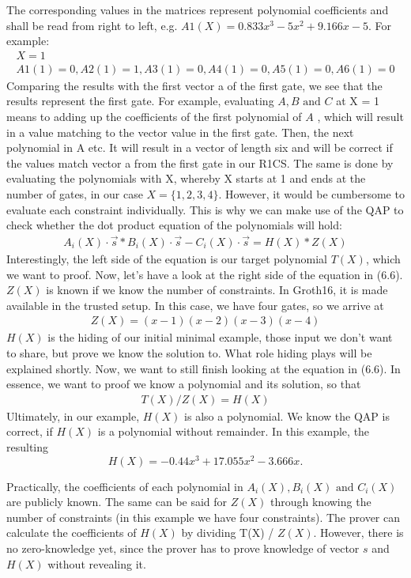 The corresponding values in the matrices represent polynomial coefficients and shall be read from right to left, e.g. \(A1(X) = 0.833x^3 - 5x^2 + 9.166x -5\). For example:
\begin{align}
     X = 1 \\
    A1(1) = 0, A2(1) = 1, A3(1) = 0, A4(1) = 0, A5(1) = 0, A6(1) = 0
\end{align}
Comparing the results with the first vector a of the first gate, we see that the results represent the first gate.
For example, evaluating \(A, B \text{ and }C\) at X = 1 means to adding up the coefficients of the first polynomial of \(A\) , which will result in a value matching to the vector value in the first gate. Then, the next polynomial in A etc. It will result in a vector of length six and will be correct if the values match vector a from the first gate in our R1CS. The same is done by evaluating the polynomials with X, whereby X starts at 1 and ends at the number of gates, in our case \(X=\{1,2,3,4\}\).
However, it would be cumbersome to evaluate each constraint individually. This is why we can make use of the QAP to check whether the dot product equation of the polynomials will hold:
\begin{align}
    A_i(X)\cdot \Vec{s} * B_i(X)\cdot \Vec{s} - C_i(X)\cdot \Vec{s} = H(X) * Z(X)
\end{align}
Interestingly, the left side of the equation is our target polynomial \(T(X)\), which we want to proof.
Now, let's have a look at the right side of the equation in (6.6). \(Z(X)\) is known if we know the number of constraints. In Groth16, it is made available in the trusted setup. In this case, we have four gates, so we arrive at
\begin{align}
    Z(X) = (x-1)(x-2)(x-3)(x-4)
\end{align}
\(H(X)\) is the hiding of our initial minimal example, those input we don't want to share, but prove we know the solution to. What role hiding plays will be explained shortly. Now, we want to still finish looking at the equation in (6.6). In essence, we want to proof we know a polynomial and its solution, so that
\begin{align}
    T(X) / Z(X) = H(X)
\end{align}
Ultimately, in our example, \(H(X)\) is also a polynomial. We know the QAP is correct, if \(H(X)\) is a polynomial without remainder. In this example, the resulting
\[H(X) = -0.44x^3 + 17.055x^2 - 3.666x.\]

Practically, the coefficients of each polynomial in \(A_i(X), B_i(X) \text{ and }C_i(X)\) are publicly known. The same can be said for \(Z(X)\) through knowing the number of constraints (in this example we have four constraints). The prover can calculate the coefficients of \(H(X)\) by dividing T(X) / \(Z(X)\). However, there is no zero-knowledge yet, since the prover has to prove knowledge of vector \(s\) and \(H(X)\) without revealing it.
\newpage

